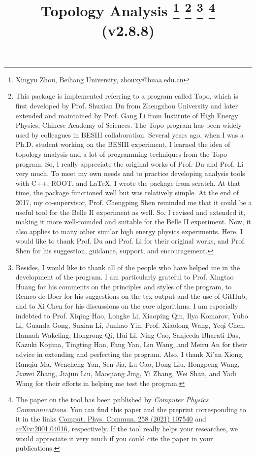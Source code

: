 \documentclass[landscape]{article}
\begin{document}
\title{Topology Analysis \footnote{\small{Xingyu Zhou, Beihang University, zhouxy@buaa.edu.cn}} \footnote{\small{This package is implemented referring to a program called {\sc Topo}, which is first developed by Prof. Shuxian Du from Zhengzhou University and later extended and maintained by Prof. Gang Li from Institute of High Energy Physics, Chinese Academy of Sciences. The {\sc Topo} program has been widely used by colleagues in BESIII collaboration. Several years ago, when I was a Ph.D. student working on the BESIII experiment, I learned the idea of topology analysis and a lot of programming techniques from the {\sc Topo} program. So, I really appreciate the original works of Prof. Du and Prof. Li very much. To meet my own needs and to practice developing analysis tools with C++, ROOT, and LaTeX, I wrote the package from scratch. At that time, the package functioned well but was relatively simple. At the end of 2017, my co-supervisor, Prof. Chengping Shen reminded me that it could be a useful tool for the Belle II experiment as well. So, I revised and extended it, making it more well-rounded and suitable for the Belle II experiment. Now, it also applies to many other similar high energy physics experiments. Here, I would like to thank Prof. Du and Prof. Li for their original works, and Prof. Shen for his suggestion, guidance, support, and encouragement.}} \footnote{\small{Besides, I would like to thank all of the people who have helped me in the development of the program. I am particularly grateful to Prof. Xingtao Huang for his comments on the principles and styles of the program, to Remco de Boer for his suggestions on the tex output and the use of GitHub, and to Xi Chen for his discussions on the core algorithms. I am especially indebted to Prof. Xiqing Hao, Longke Li, Xiaoping Qin, Ilya Komarov, Yubo Li, Guanda Gong, Suxian Li, Junhao Yin, Prof. Xiaolong Wang, Yeqi Chen, Hannah Wakeling, Hongrong Qi, Hui Li, Ning Cao, Sanjeeda Bharati Das, Kazuki Kojima, Tingting Han, Fang Yan, Lin Wang, and Meiru An for their advice in extending and perfecting the program. Also, I thank Xi'an Xiong, Runqiu Ma, Wencheng Yan, Sen Jia, Lu Cao, Dong Liu, Hongpeng Wang, Jiawei Zhang, Jiajun Liu, Maoqiang Jing, Yi Zhang, Wei Shan, and Yadi Wang for their efforts in helping me test the program.}} \footnote{\small{The paper on the tool has been published by {\it Computer Physics Communications}. You can find this paper and the preprint corresponding to it in the links \href{https://doi.org/10.1016/j.cpc.2020.107540}{Comput. Phys. Commun. 258 (2021) 107540} and \href{https://arxiv.org/abs/2001.04016}{arXiv:2001.04016}, respectively. If the tool really helps your researches, we would appreciate it very much if you could cite the paper in your publications.}} \\ \vspace{1cm} \Large{(v2.8.8)}}
\maketitle
\end{document}
